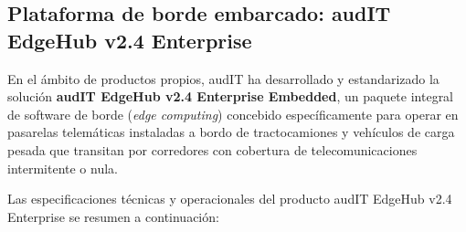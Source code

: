 \subsection{Plataforma de borde embarcado: audIT EdgeHub v2.4 Enterprise}\label{sec:1-edgehub}

En el ámbito de productos propios, audIT ha desarrollado y estandarizado la solución \textbf{audIT EdgeHub v2.4 Enterprise Embedded}, un paquete integral de software de borde (\textit{edge computing}) concebido específicamente para operar en pasarelas telemáticas instaladas a bordo de tractocamiones y vehículos de carga pesada que transitan por corredores con cobertura de telecomunicaciones intermitente o nula.

Las especificaciones técnicas y operacionales del producto audIT EdgeHub v2.4 Enterprise se resumen a continuación:


